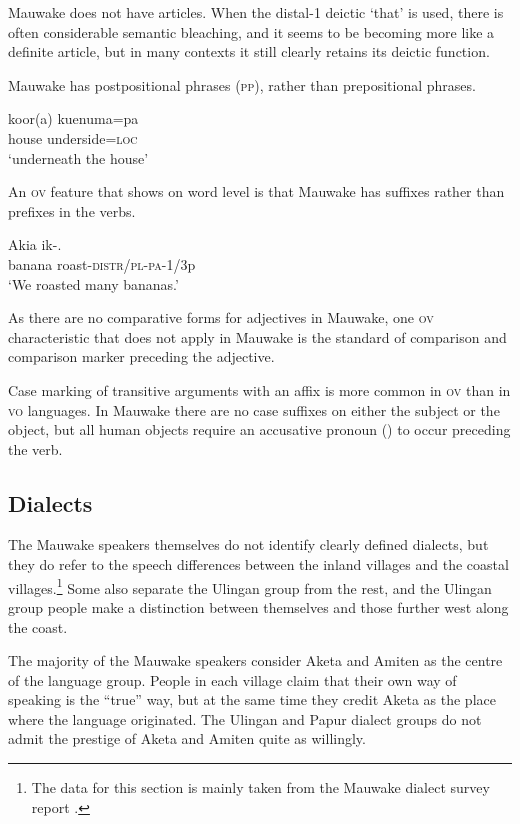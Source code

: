 Mauwake does not have articles. When the distal-1 deictic  `that' is used,  there is often considerable semantic bleaching, and it seems to be becoming more like a definite article, but in many contexts it still clearly retains its deictic function.  

Mauwake has postpositional phrases (\textsc{pp}), rather than prepositional phrases.

\ea%
\label{ex:1:x681}
\gll koor(a)  kuenuma=pa \\
 house  underside=\textsc{loc}     \\
\glt`underneath the house'
\z


An \textsc{ov} feature that shows on word level is that Mauwake has suffixes rather than prefixes in the verbs.

\ea%
\label{ex:1:x682}
\gll Akia  ik-. \\
 banana  roast-\textsc{distr}/\textsc{pl}-\textsc{pa}-1/3p     \\
\glt`We roasted many bananas.'
\z


As there are no comparative forms for adjectives in Mauwake, one \textsc{ov} characteristic that does not apply in Mauwake is the standard of comparison and comparison marker preceding the adjective. 

Case marking of transitive arguments with an affix is more common in \textsc{ov} than in \textsc{vo} languages.  In Mauwake there are no case suffixes on either the subject or the object, but all human objects require an accusative pronoun () to occur preceding the verb.

\subsection{Dialects}


The Mauwake speakers themselves do not identify clearly defined dialects, but they do refer to the speech differences between the inland villages and the coastal villages.\footnote{The data for this section is mainly taken from the Mauwake dialect survey report \citep{Jarvinen1988ms}.} Some also separate the Ulingan group from the rest, and the Ulingan group people make a distinction between themselves and those further west along the coast.

The majority of the Mauwake speakers consider Aketa and Amiten as the centre of the language group. People in each village claim that their own way of speaking is the ``true'' way, but at the same time they credit Aketa as the place where the language originated.  The Ulingan and Papur dialect groups do not admit the prestige of Aketa and Amiten quite as willingly.

